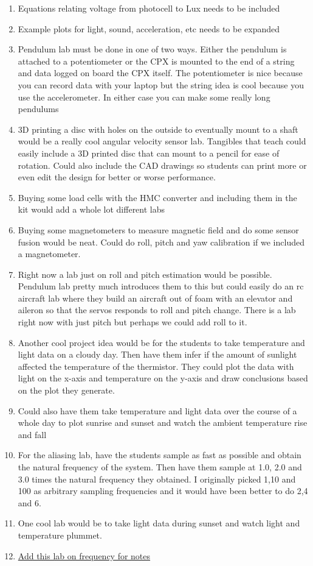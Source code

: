 \begin{enumerate}[itemsep=-5pt]
\item Equations relating voltage from photocell to Lux needs to be included
\item Example plots for light, sound, acceleration, etc needs to be expanded
\item Pendulum lab must be done in one of two ways. Either the pendulum is attached to a potentiometer or the CPX is mounted to the end of a string and data logged on board the CPX itself. The potentiometer is nice because you can record data with your laptop but the string idea is cool because you use the accelerometer. In either case you can make some really long pendulums
\item 3D printing a disc with holes on the outside to eventually mount to a shaft would be a really cool angular velocity sensor lab. Tangibles that teach could easily include a 3D printed disc that can mount to a pencil for ease of rotation. Could also include the CAD drawings so students can print more or even edit the design for better or worse performance.
\item Buying some load cells with the HMC converter and including them in the kit would add a whole lot different labs
\item Buying some magnetometers to measure magnetic field and do some sensor fusion would be neat. Could do roll, pitch and yaw calibration if we included a magnetometer.
\item Right now a lab just on roll and pitch estimation would be possible. Pendulum lab pretty much introduces them to this but could easily do an rc aircraft lab where they build an aircraft out of foam with an elevator and aileron so that the servos responds to roll and pitch change. There is a lab right now with just pitch but perhaps we could add roll to it.
\item Another cool project idea would be for the students to take temperature and light data on a cloudy day. Then have them infer if the amount of sunlight affected the temperature of the thermistor. They could plot the data with light on the x-axis and temperature on the y-axis and draw conclusions based on the plot they generate.
\item Could also have them take temperature and light data over the course of a whole day to plot sunrise and sunset and watch the ambient temperature rise and fall
\item For the aliasing lab, have the students sample as fast as possible and obtain the natural frequency of the system. Then have them sample at 1.0, 2.0 and 3.0 times the natural frequency they obtained. I originally picked 1,10 and 100 as arbitrary sampling frequencies and it would have been better to do 2,4 and 6.
\item One cool lab would be to take light data during sunset and watch light and temperature plummet.
\item \href{https://learn.adafruit.com/circuit-playground-o-phonor/musical-note-basics}{Add this lab on frequency for notes}
\end{enumerate}
